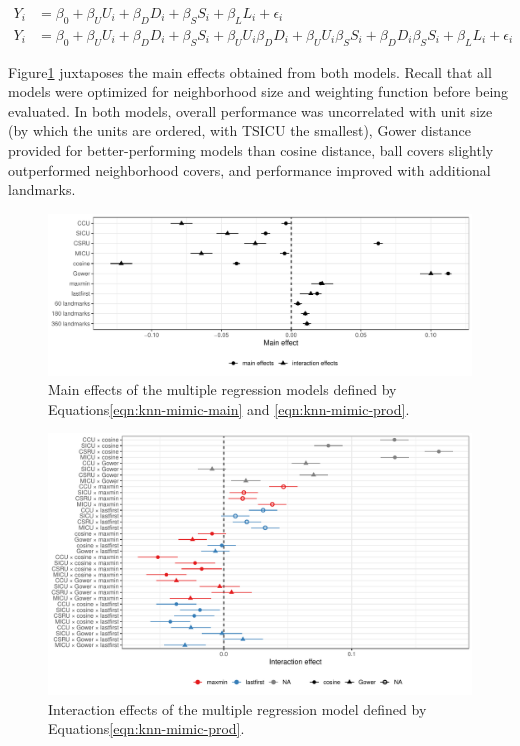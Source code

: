 \documentclass{article}
\begin{document}
\begin{align}
\label{eqn:knn-mimic-main}
Y_i &= \beta_0 + \beta_U U_i + \beta_D D_i + \beta_S S_i + \beta_L L_i + \epsilon_i \\
\label{eqn:knn-mimic-prod}
Y_i &= \beta_0 + \beta_U U_i + \beta_D D_i + \beta_S S_i + \beta_U U_i \beta_D D_i + \beta_U U_i \beta_S S_i + \beta_D D_i \beta_S S_i + \beta_L L_i + \epsilon_i
\end{align}

Figure\nbs\ref{fig:knn-mimic-main} juxtaposes the main effects obtained
from both models. Recall that all models were optimized for neighborhood
size and weighting function before being evaluated. In both models,
overall performance was uncorrelated with unit size (by which the units
are ordered, with TSICU the smallest), Gower distance provided for
better-performing models than cosine distance, ball covers slightly
outperformed neighborhood covers, and performance improved with
additional landmarks.

\begin{figure}
\includegraphics[width=\textwidth]{../figures/knn-compare-main}
\caption{
Main effects of the multiple regression models defined by Equations\nbs\ref{eqn:knn-mimic-main} and \ref{eqn:knn-mimic-prod}.
\label{fig:knn-mimic-main}
}
\end{figure}

\begin{figure}
\includegraphics[width=\textwidth]{../figures/knn-compare-prod}
\caption{
Interaction effects of the multiple regression model defined by Equations\nbs\ref{eqn:knn-mimic-prod}.
\label{fig:knn-mimic-prod}
}
\end{figure}
\end{document}
